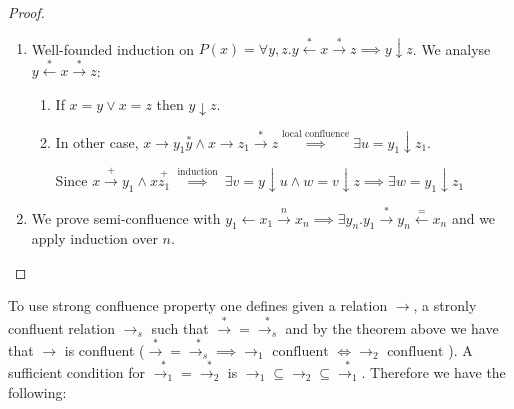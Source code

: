 \begin{proof}
\begin{enumerate}
\item Well-founded induction on $P(x) = \forall y,z.y \stackrel{*}{\gets} x \stackrel{*}{\to} z \implies y \downarrow z$. We analyse $y \stackrel{*}{\gets} x \stackrel{*}{\to} z$:

\begin{enumerate}
\item If $x = y \lor x = z$ then $y \downarrow z$. 
\item In other case, $x \to y_1 \stackrel{*}{y} \land x \to z_1 \stackrel{*}{\to} z \stackrel{\text{local confluence}}{\implies} \exists u = y_1 \downarrow z_1$.

Since $x \stackrel{+}{\to} y_1 \land x \stackrel{+}{z_1} \stackrel{\text{ induction }}{\implies} \exists v = y \downarrow u \land w = v \downarrow z \implies \exists w = y_1 \downarrow z_1$
\end{enumerate}


\item We prove semi-confluence with $y_1 \gets x_1 \stackrel{n}{\to} x_n \implies \exists y_n.y_1 \stackrel{*}{\to} y_n \stackrel{=}{\gets} x_n$ and we apply induction over $n$.

\end{enumerate}
\end{proof}

To use strong confluence property one defines given a relation $\to$, a stronly confluent relation $\to_s$ such that $\stackrel{*}{\to} = \stackrel{*}{\to_s}$ and by the theorem above we have that $\to$ is confluent ($\stackrel{*}{\to} = \stackrel{*}{\to_s} \implies \to_1 \text{ confluent } \iff \to_2 \text{ confluent }$). A sufficient condition for $\stackrel{*}{\to_1} = \stackrel{*}{\to_2}$ is $\to_1 \subseteq \to_2 \subseteq \stackrel{*}{\to_1}$. Therefore we have the following:

